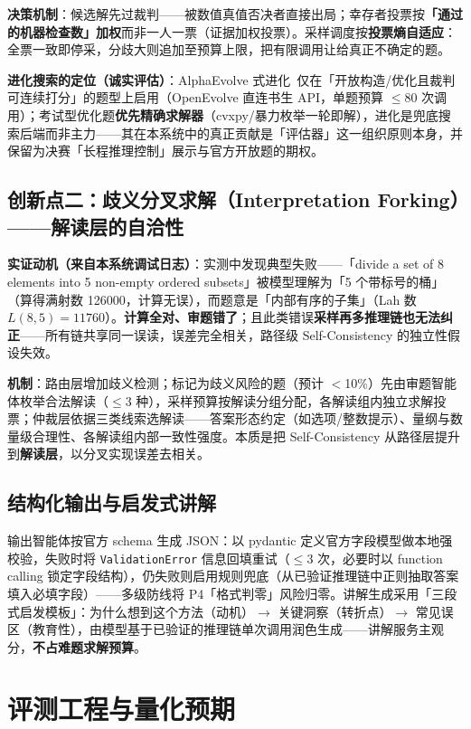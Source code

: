 \documentclass[11pt, a4paper]{ctexart}
\newcommand{\hl}[1]{\textcolor{accentred}{\textbf{#1}}}
\begin{document}
\textbf{决策机制}：候选解先过裁判——被数值真值否决者直接出局；幸存者投票按\hl{「通过的机器检查数」加权}而非一人一票（证据加权投票）。采样调度按\hl{投票熵自适应}：全票一致即停采，分歧大则追加至预算上限，把有限调用让给真正不确定的题。

\textbf{进化搜索的定位（诚实评估）}：AlphaEvolve 式进化~\cite{alphaevolve,openevolve}仅在「开放构造/优化且裁判可连续打分」的题型上启用（OpenEvolve 直连书生 API，单题预算 $\leq$80 次调用）；考试型优化题\hl{优先精确求解器}（cvxpy/暴力枚举一轮即解），进化是兜底搜索后端而非主力——其在本系统中的真正贡献是「评估器」这一组织原则本身，并保留为决赛「长程推理控制」展示与官方开放题的期权。

\subsection{创新点二：歧义分叉求解（Interpretation Forking）——解读层的自洽性}

\textbf{实证动机（来自本系统调试日志）}：实测中发现典型失败——「divide a set of 8 elements into 5 non-empty ordered subsets」被模型理解为「5 个带标号的桶」（算得满射数 126000，计算无误），而题意是「内部有序的子集」（Lah 数 $L(8,5){=}11760$）。\hl{计算全对、审题错了}；且此类错误\hl{采样再多推理链也无法纠正}——所有链共享同一误读，误差完全相关，路径级 Self-Consistency 的独立性假设失效。

\textbf{机制}：路由层增加歧义检测；标记为歧义风险的题（预计 $<$10\%）先由审题智能体枚举合法解读（$\leq$3 种），采样预算按解读分组分配，各解读组内独立求解投票；仲裁层依据三类线索选解读——答案形态约定（如选项/整数提示）、量纲与数量级合理性、各解读组内部一致性强度。本质是把 Self-Consistency 从路径层提升到\hl{解读层}，以分叉实现误差去相关。

\subsection{结构化输出与启发式讲解}

输出智能体按官方 schema 生成 JSON：以 pydantic 定义官方字段模型做本地强校验，失败时将 \texttt{ValidationError} 信息回填重试（$\leq$3 次，必要时以 function calling 锁定字段结构），仍失败则启用规则兜底（从已验证推理链中正则抽取答案填入必填字段）——多级防线将 P4「格式判零」风险归零。讲解生成采用「三段式启发模板」：为什么想到这个方法（动机）$\rightarrow$ 关键洞察（转折点）$\rightarrow$ 常见误区（教育性），由模型基于已验证的推理链单次调用润色生成——讲解服务主观分，\hl{不占难题求解预算}。

\section{评测工程与量化预期}
\end{document}

